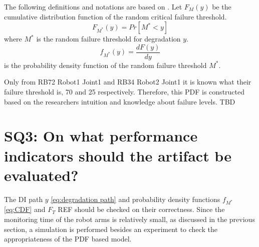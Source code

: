 The following definitions and notations are based on \citet{Usynin2008}. Let $F_{M}(y)$ be the cumulative distribution function of the random critical failure threshold.
\begin{equation} \label{eq:CDF}
F_{M^*}(y)=Pr[M^*< y]
\end{equation}
where $M^*$ is the random failure threshold for degradation $y$.
\begin{equation}
f_{M^*}(y) = \frac{dF(y)}{dy}
\end{equation}
is the probability density function of the random failure threshold $M^*$. 

Only from RB72 Robot1 Joint1 and RB34 Robot2 Joint1 it is known what their failure threshold is, 70 and 25 respectively. Therefore, this PDF is constructed based on the researchers intuition and knowledge about failure levels. TBD



\section{SQ3: On what performance indicators should the artifact be evaluated?} \label{SQ3}
The DI path $y$ \ref{eq:degradation path} and probability density functions $f_{M^*}$ \ref{eq:CDF} and $F_{T}$ REF should be checked on their correctness. Since the monitoring time of the robot arms is relatively small, as discussed in the previous section, a simulation is performed besides an experiment to check the appropriateness of the PDF based model. 

